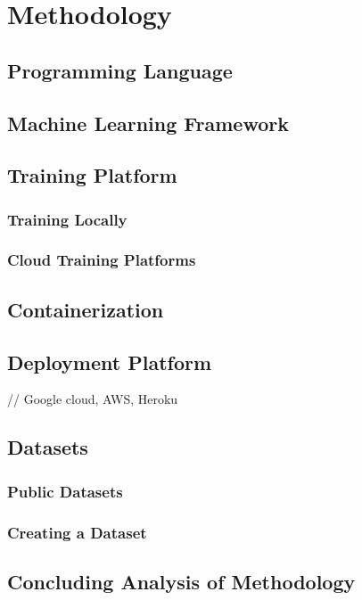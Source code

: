 \chapter{Methodology}

\section{Programming Language}

\section{Machine Learning Framework}

\section{Training Platform}
\subsection{Training Locally}
\subsection{Cloud Training Platforms}


\section{Containerization}

\section{Deployment Platform}
// Google cloud, AWS, Heroku

\section{Datasets}
\subsection{Public Datasets}
\subsection{Creating a Dataset}

\section{Concluding Analysis of Methodology}
